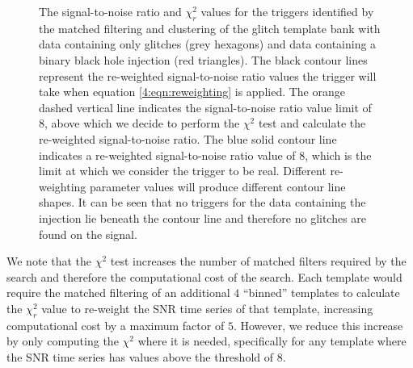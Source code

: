 \begin{figure}
  \caption{The signal-to-noise ratio and $\chi_{r}^{2}$ values for the triggers identified by the matched filtering and clustering of the \scl{} glitch template bank with data containing only \scl{} glitches (grey hexagons) and data containing a binary black hole \gw{} injection (red triangles). The black contour lines represent the re-weighted signal-to-noise ratio values the trigger will take when equation \ref{4:eqn:reweighting} is applied. The orange dashed vertical line indicates the signal-to-noise ratio value limit of 8, above which we decide to perform the $\chi^{2}$ test and calculate the re-weighted signal-to-noise ratio. The blue solid contour line indicates a re-weighted signal-to-noise ratio value of 8, which is the limit at which we consider the trigger to be real. Different re-weighting parameter values will produce different contour line shapes. It can be seen that no triggers for the data containing the \gw{} injection lie beneath the contour line and therefore no \scl{} glitches are found on the \gw{} signal.}
  \label{4:fig:chi_snr}
\end{figure}

We note that the $\chi^{2}$ test increases the number of matched filters required by the search and therefore the computational cost of the search. Each template would require the matched filtering of an additional $4$ ``binned'' templates to calculate the $\chi_{r}^{2}$ value to re-weight the SNR time series of that template, increasing computational cost by a maximum factor of $5$. However, we reduce this increase by only computing the $\chi^{2}$ where it is needed, specifically for any template where the SNR time series has values above the threshold of 8.

